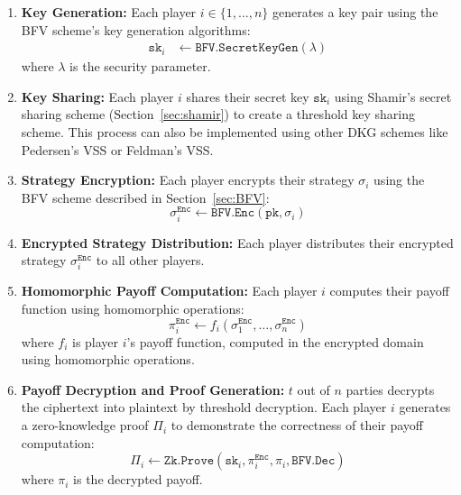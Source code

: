 \documentclass[11pt]{article}
\begin{document}
\begin{enumerate}
  \item \textbf{Key Generation:} Each player $i \in \{1, \ldots, n\}$ generates a key pair using the BFV scheme's key generation algorithms:
    \begin{align}
      \texttt{sk}_i &\leftarrow \texttt{BFV.SecretKeyGen}(\lambda) 
    \end{align}
    where $\lambda$ is the security parameter.
  \item \textbf{Key Sharing:} Each player $i$ shares their secret key $\texttt{sk}_i$ using Shamir's secret sharing scheme (Section~\ref{sec:shamir}) to create a threshold key sharing scheme. This process can also be implemented using other DKG schemes like Pedersen's VSS\cite{fudenberg1991game} or Feldman's VSS\cite{feldman1987practical}\cite{gennaro2007secure}.
  
  \item \textbf{Strategy Encryption:} Each player encrypts their strategy $\sigma_i$ using the BFV scheme described in Section~\ref{sec:BFV}:
    \begin{equation}
      \sigma^\texttt{Enc}_i \leftarrow \texttt{BFV.Enc}(\texttt{pk}, \sigma_i)
    \end{equation}
  
  \item \textbf{Encrypted Strategy Distribution:} Each player distributes their encrypted strategy $\sigma^\texttt{Enc}_i$ to all other players.
  
  \item \textbf{Homomorphic Payoff Computation:} Each player $i$ computes their payoff function using homomorphic operations:
    \begin{equation}
      \pi^\texttt{Enc}_i \leftarrow f_i(\sigma^\texttt{Enc}_1, \ldots, \sigma^\texttt{Enc}_n)
    \end{equation}
    where $f_i$ is player $i$'s payoff function, computed in the encrypted domain using homomorphic operations.
  
  \item \textbf{Payoff Decryption and Proof Generation:} $t$ out of $n$ parties decrypts the ciphertext into plaintext by threshold decryption. Each player $i$ generates a zero-knowledge proof $\Pi_i$ to demonstrate the correctness of their payoff computation:
    \begin{equation}
      \Pi_i \leftarrow \texttt{Zk.Prove}(\texttt{sk}_i, \pi^\texttt{Enc}_i, \pi_i, \texttt{BFV.Dec})
    \end{equation}
    where $\pi_i$ is the decrypted payoff.
\end{enumerate}
\end{document}

